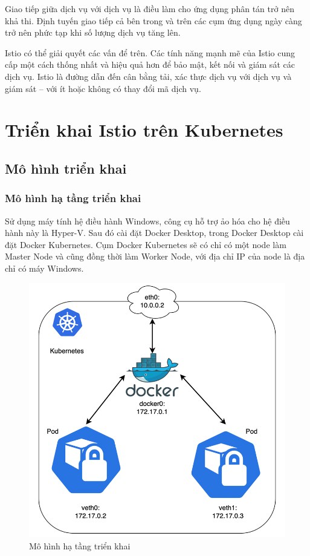 \documentclass[12pt,a4paper]{report}
\begin{document}
{{		Giao tiếp giữa dịch vụ với dịch vụ là điều làm cho ứng dụng phân tán trở nên khả thi. Định tuyến giao tiếp cả bên trong và trên các cụm ứng dụng ngày càng trở nên phức tạp khi số lượng dịch vụ tăng lên.
		
		Istio có thể giải quyết các vấn để trên. Các tính năng mạnh mẽ của Istio cung cấp một cách thống nhất và hiệu quả hơn để bảo mật, kết nối và giám sát các dịch vụ. Istio là đường dẫn đến cân bằng tải, xác thực dịch vụ với dịch vụ và giám sát – với ít hoặc không có thay đổi mã dịch vụ.
		
\chapter{Triển khai Istio trên Kubernetes}
	\section{Mô hình triển khai}
	\subsection{Mô hình hạ tầng triển khai}
	Sử dụng máy tính hệ điều hành Windows, công cụ hỗ trợ ảo hóa cho hệ điều hành này là Hyper-V. Sau đó cài đặt Docker Desktop, trong Docker Desktop  cài đặt Docker Kubernetes. Cụm Docker Kubernetes sẽ có chỉ có một node làm Master Node và cũng đồng thời làm Worker Node, với địa chỉ IP của node là địa chỉ có máy Windows.
	
	\begin{figure}[h]
		\centering
		\includegraphics[width=0.7\linewidth]{Pics/3.1.1-1}
		\caption{Mô hình hạ tầng triển khai}
		\label{fig:3.1.1-1}
	\end{figure}
	\newpage
}}
\end{document}
